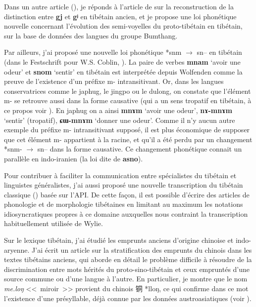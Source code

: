 \documentclass[oldfontcommands,oneside,a4paper,11pt]{memoir}
\newcommand{\ipa}[1]{{\phon\textbf{#1}}}
\newcommand{\zh}[1]{{\cn #1}}
\begin{document}
Dans un autre article (\citealt{jacques13yod}), je réponds à l'article de \citet{hill12gy} sur la reconstruction de la distinction entre \ipa{gj} et \ipa{gʲ} en tibétain ancien, et je propose une loi phonétique nouvelle concernant l'évolution des semi-voyelles du proto-tibétain en tibétain, sur la base de données des langues du groupe Bumthang.

Par ailleurs, j'ai proposé une nouvelle loi phonétique *snm $\rightarrow$ sn-- en tibétain (dans le Festschrift pour W.S. Coblin, \citealt{jacques14snom}). La paire de verbes \ipa{mnam} `avoir une odeur' et \ipa{snom} `sentir' en tibétain est interprétée depuis Wolfenden comme la preuve de l'existence d'un préfixe m- intransitivant. Or, dans les langues conservatrices comme le japhug, le jingpo ou le dulong, on constate que l'élément m- se retrouve aussi dans la forme causative (qui a un sens tropatif en tibétain, à ce propos voir \citealt{jacques13tropative}). En japhug on a ainsi \ipa{mnɤm} `avoir une odeur', \ipa{nɤ-mnɤm} `sentir' (tropatif), \ipa{ɕɯ-mnɤm} `donner une odeur'. Comme il n'y aucun autre exemple du préfixe m- intransitivant supposé, il est plus économique de supposer que cet élément m- appartient à la racine, et qu'il a été perdu par un changement *snm- $\rightarrow$ sn-- dans la forme causative. Ce changement phonétique connait un parallèle en indo-iranien (la loi dite de \ipa{asno}).

Pour contribuer à faciliter la communication entre spécialistes du tibétain et linguistes généralistes, j'ai aussi proposé une nouvelle transcription du tibétain classique (\citealt{jacques12transcription}) basée sur l'API. De cette façon, il est possible d'écrire des articles de phonologie et de morphologie tibétaines en limitant au maximum les notations idiosyncratiques propres à ce domaine auxquelles nous contraint la transcription habituellement utilisée de Wylie.

Sur le lexique tibétain, j’ai étudié les emprunts anciens d’origine chinoise et indo-aryenne. J’ai écrit un article sur la stratification des emprunts du chinois dans les textes tibétains anciens, qui aborde en détail le problème difficile à résoudre de la discrimination entre mots hérités du proto-sino-tibétain et ceux empruntés d’une source commune ou d’une langue à l’autre. En particulier, je montre que le nom \textit{me.loŋ} <<~miroir~>> provient du chinois \zh{铜} *lloŋ, ce qui confirme dans ce mot l'existence d'une présyllable, déjà connue par les données austroasiatiques (voir \citealt{sagart99roc}). 
\end{document}
